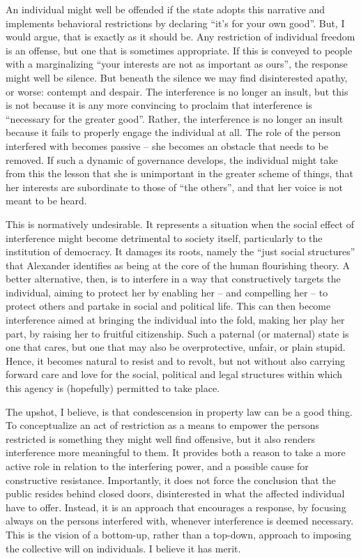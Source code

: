 \documentclass[12pt,a4paper]{book} %
\begin{document}
An individual might well be offended if the state adopts this narrative and implements behavioral restrictions by declaring ``it's for your own good''. But, I would argue, that is exactly as it should be. Any restriction of individual freedom is an offense, but one that is sometimes appropriate. If this is conveyed to people with a marginalizing ``your interests are not as important as ours'', the response might well be silence. But beneath the silence we may find disinterested apathy, or worse: contempt and despair. The interference is no longer an insult, but this is not because it is any more convincing to proclaim that interference is ``necessary for the greater good''. Rather, the interference is no longer an insult because it fails to properly engage the individual at all. The role of the person interfered with becomes passive -- she becomes an obstacle that needs to be removed. If such a dynamic of governance develops, the individual might take from this the lesson that she is unimportant in the greater scheme of things, that her interests are subordinate to those of ``the others'', and that her voice is not meant to be heard.

This is normatively undesirable. It represents a situation when the social effect of interference might become detrimental to society itself, particularly to the institution of democracy. It damages its roots, namely the ``just social structures'' that Alexander identifies as being at the core of the human flourishing theory. A better alternative, then, is to interfere in a way that constructively targets the individual, aiming to protect her by enabling her -- and compelling her -- to protect others and partake in social and political life. This can then become interference aimed at bringing the individual into the fold, making her play her part, by raising her to fruitful citizenship. Such a paternal (or maternal) state is one that cares, but one that may also be overprotective, unfair, or plain stupid. Hence, it becomes natural to resist and to revolt, but not without also carrying forward care and love for the social, political and legal structures within which this agency is (hopefully) permitted to take place.

The upshot, I believe, is that condescension in property law can be a good thing. To conceptualize an act of restriction as a means to empower the persons restricted is something they might well find offensive, but it also renders interference more meaningful to them. It provides both a reason to take a more active role in relation to the interfering power, and a possible cause for constructive resistance. Importantly, it does not force the conclusion that the public resides behind closed doors, disinterested in what the affected individual have to offer. Instead, it is an approach that encourages a response, by focusing always on the persons interfered with, whenever interference is deemed necessary. This is the vision of a bottom-up, rather than a top-down, approach to imposing the collective will on individuals. I believe it has merit. 
\end{document}
